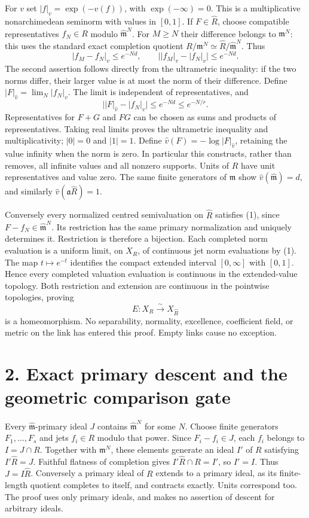 \documentclass[11pt]{article}
\begin{document}
For $v$ set $|f|_v=\exp(-v(f))$, with $\exp(-\infty)=0$. This is a multiplicative nonarchimedean seminorm with values in $[0,1]$. If $F\in\widehat R$, choose compatible representatives $f_N\in R$ modulo $\widehat{\mathfrak m}^N$. For $M\ge N$ their difference belongs to $\mathfrak m^N$: this uses the standard exact completion quotient $R/\mathfrak m^N\simeq\widehat R/\widehat{\mathfrak m}^N$. Thus
\[
 |f_M-f_N|_v\le e^{-Nd},\qquad
 \big||f_M|_v-|f_N|_v\big|\le e^{-Nd}.
\]
The second assertion follows directly from the ultrametric inequality: if the two norms differ, their larger value is at most the norm of their difference. Define $|F|_{\widehat v}=\lim_N|f_N|_v$. The limit is independent of representatives, and
\[
 \big||F|_{\widehat v}-|f_N|_v\big|\le e^{-Nd}\le e^{-N/r}. \tag{1}
\]
Representatives for $F+G$ and $FG$ can be chosen as sums and products of representatives. Taking real limits proves the ultrametric inequality and multiplicativity; $|0|=0$ and $|1|=1$. Define $\widehat v(F)=-\log|F|_{\widehat v}$, retaining the value infinity when the norm is zero. In particular this constructs, rather than removes, all infinite values and all nonzero supports. Units of $\widehat R$ have unit representatives and value zero. The same finite generators of $\mathfrak m$ show $\widehat v(\widehat{\mathfrak m})=d$, and similarly $\widehat v(\mathfrak a\widehat R)=1$.

Conversely every normalized centred semivaluation on $\widehat R$ satisfies (1), since $F-f_N\in\widehat{\mathfrak m}^N$. Its restriction has the same primary normalization and uniquely determines it. Restriction is therefore a bijection. Each completed norm evaluation is a uniform limit, on $X_R$, of continuous jet norm evaluations by (1). The map $t\mapsto e^{-t}$ identifies the compact extended interval $[0,\infty]$ with $[0,1]$. Hence every completed valuation evaluation is continuous in the extended-value topology. Both restriction and extension are continuous in the pointwise topologies, proving
\[
 E:X_R\overset\sim\longrightarrow X_{\widehat R} \tag{2}
\]
is a homeomorphism. No separability, normality, excellence, coefficient field, or metric on the link has entered this proof. Empty links cause no exception.

\section{2. Exact primary descent and the geometric comparison gate}

Every $\widehat{\mathfrak m}$-primary ideal $J$ contains $\widehat{\mathfrak m}^N$ for some $N$. Choose finite generators $F_1,\ldots,F_s$ and jets $f_i\in R$ modulo that power. Since $F_i-f_i\in J$, each $f_i$ belongs to $I=J\cap R$. Together with $\mathfrak m^N$, these elements generate an ideal $I'$ of $R$ satisfying $I'\widehat R=J$. Faithful flatness of completion gives $I'\widehat R\cap R=I'$, so $I'=I$. Thus $J=I\widehat R$. Conversely a primary ideal of $R$ extends to a primary ideal, as its finite-length quotient completes to itself, and contracts exactly. Units correspond too. The proof uses only primary ideals, and makes no assertion of descent for arbitrary ideals.
\end{document}
